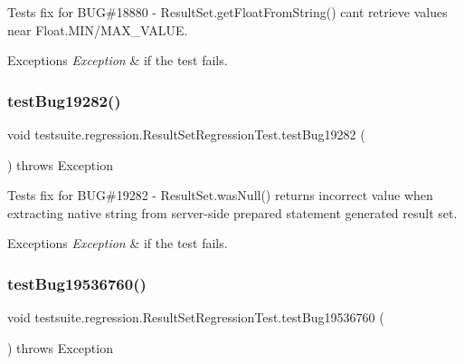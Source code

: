 Tests fix for B\+UG\#18880 -\/ Result\+Set.\+get\+Float\+From\+String() can\textquotesingle{}t retrieve values near Float.\+M\+IN/\+M\+A\+X\+\_\+\+V\+A\+L\+UE.


\begin{DoxyExceptions}{Exceptions}
{\em Exception} & if the test fails. \\
\hline
\end{DoxyExceptions}
\mbox{\label{classtestsuite_1_1regression_1_1_result_set_regression_test_ace41da4e4b41051800b1bb47347f5f5a}} 
\subsubsection{\texorpdfstring{test\+Bug19282()}{testBug19282()}}
{\footnotesize\ttfamily void testsuite.\+regression.\+Result\+Set\+Regression\+Test.\+test\+Bug19282 (\begin{DoxyParamCaption}{ }\end{DoxyParamCaption}) throws Exception}

Tests fix for B\+UG\#19282 -\/ Result\+Set.\+was\+Null() returns incorrect value when extracting native string from server-\/side prepared statement generated result set.


\begin{DoxyExceptions}{Exceptions}
{\em Exception} & if the test fails. \\
\hline
\end{DoxyExceptions}
\mbox{\label{classtestsuite_1_1regression_1_1_result_set_regression_test_a84aedc11c7b191cccc83a821ad7b3927}} 
\subsubsection{\texorpdfstring{test\+Bug19536760()}{testBug19536760()}}
{\footnotesize\ttfamily void testsuite.\+regression.\+Result\+Set\+Regression\+Test.\+test\+Bug19536760 (\begin{DoxyParamCaption}{ }\end{DoxyParamCaption}) throws Exception}

